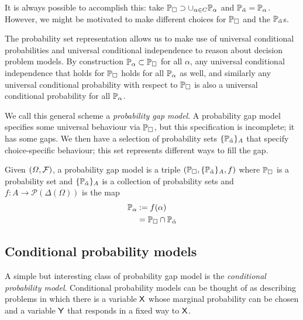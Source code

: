 It is always possible to accomplish this: take $\mathbb{P}_\square\supset \cup_{\alpha\in C} \mathbb{P}_\alpha$ and $\mathbb{P}_{\tilde{\alpha}}=\mathbb{P}_\alpha$. However, we might be motivated to make different choices for $\mathbb{P}_\square$ and the $\mathbb{P}_{\tilde{\alpha}}$s.

The probability set representation allows us to make use of universal conditional probabilities and universal conditional independence to reason about decision problem models. By construction $\mathbb{P}_\alpha\subset \mathbb{P}_\square$ for all $\alpha$, any universal conditional independence that holds for $\mathbb{P}_\square$ holds for all $\mathbb{P}_\alpha$ as well, and similarly any universal conditional probability with respect to $\mathbb{P}_\square$ is also a universal conditional probability for all $\mathbb{P}_\alpha$.

We call this general scheme a \emph{probability gap model}. A probability gap model specifies some universal behaviour via $\mathbb{P}_\square$, but this specification is incomplete; it has some gaps. We then have a selection of probability sets $\{\mathbb{P}_{\tilde{\alpha}}\}_A$ that specify choice-specific behaviour; this set represents different ways to fill the gap.

\begin{definition}
Given $(\Omega,\mathcal{F})$, a probability gap model is a triple $(\mathbb{P}_\square,\{\mathbb{P}_{\tilde{\alpha}}\}_A,f)$ where $\mathbb{P}_\square$ is a probability set and $\{\mathbb{P}_{\tilde{\alpha}}\}_A$ is a collection of probability sets and $f:A\to \mathscr{P}(\Delta(\Omega))$ is the map
\begin{align}
    \mathbb{P}_\alpha&:=f(\alpha)\\
    &= \mathbb{P}_\square\cap \mathbb{P}_{\tilde{\alpha}}
\end{align}
\end{definition}

\subsection{Conditional probability models}

A simple but interesting class of probability gap model is the \emph{conditional probability model}. Conditional probability models can be thought of as describing problems in which there is a variable $\mathsf{X}$ whose marginal probability can be chosen and a variable $\mathsf{Y}$ that responds in a fixed way to $\mathsf{X}$.

